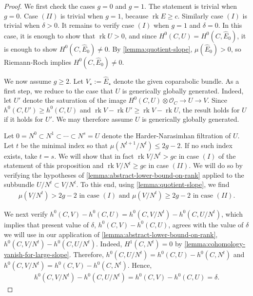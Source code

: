 \documentclass[12 pt]{amsart}
\theoremstyle{plain}
\theoremstyle{definition}
\theoremstyle{remark}
\numberwithin{equation}{section}
\DeclareMathOperator\rk{rk}
\begin{document}
\begin{proof}
	We first check the cases $g = 0$ and $g = 1$.
	The statement is trivial when $g = 0$.
	Case $(II)$ is trivial when $g = 1$, because
	$\rk E \geq c$. Similarly case $(I)$ is trivial when $\delta >
	0$.
	It remains to verify case $(I)$ when $g = 1$ and $\delta = 0$. 
	In this case, it is enough to show that $\rk U > 0$, 
	and since $H^0(C, U) = H^0(C, \widehat{E}_0)$,
	it is enough to show
	$H^0(C, \widehat{E}_0)\neq 0$.
	By \autoref{lemma:quotient-slope}, $\mu(\widehat{E}_0) > 0$,
	so Riemann-Roch implies $H^0(C, \widehat{E}_0) \neq 0$.

	We now assume $g \geq 2$.
	Let $V_\star := \widehat{E}_\star$ denote the given coparabolic bundle.
	As a first step, we reduce to the case that $U$ is generically globally
	generated.
	Indeed, let $U'$ denote the saturation of the image
	$H^0(C, U) \otimes \mathscr O_C \to U \to V$. 
	Since $h^0(C, U') \geq h^0(C, U)$ and $\rk V -
	\rk U' \geq \rk V - \rk U$, the result holds for $U$ if it holds for
	$U'$.
	We may therefore assume $U$ is generically globally generated.

	Let $0=N^0 \subset N^1 \subset \cdots \subset N^s = U$ denote the
	Harder-Narasimhan filtration of $U$.
	Let $t$ be the minimal index so that $\mu(N^{t+1}/N^{t}) \leq 2g-2$.
	If no such index exists, take $t = s$.
	We will show that in fact $\rk V/N^t > gc$ in case $(I)$ of the statement
	of this proposition
	and $\rk V/N^t \geq gc$ in case $(II)$.
	We will do so by verifying the hypotheses of
	\autoref{lemma:abstract-lower-bound-on-rank} applied to the subbundle
	$U/N^t \subset V/N^t$.
	To this end, using \autoref{lemma:quotient-slope},
	we find
	\begin{align}
		\label{equation:quotient-slope-bound}
		\mu(V/N^t) > 2g - 2 \text{ in case $(I)$ and }
	\mu(V/N^t) \geq 2g - 2 \text{ in case $(II)$.}
	\end{align}

	We next verify 
	$h^0(C, V)- h^0(C, U) = h^0(C,V/N^t) - h^0(C, U/N^t)$,
which implies that present value of $\delta$, $h^0(C, V)- h^0(C, U)$, agrees with the value of $\delta$ we will use
in our application of \autoref{lemma:abstract-lower-bound-on-rank},
	$h^0(C,V/N^t) - h^0(C, U/N^t)$.
	Indeed, $H^1(C, N^t) = 0$ by
	\autoref{lemma:cohomology-vanish-for-large-slope}.
	Therefore, 
	$h^0(C, U/N^t) = h^0(C, U) - h^0(C, N^t)$ and 
	$h^0(C, V/N^t) = h^0(C, V) - h^0(C, N^t)$. 
	Hence,
	\begin{align*}
		h^0(C, V/N^t)- h^0(C,U/N^t) = h^0(C, V) - h^0(C, U) = \delta.
	\end{align*}


\end{proof}
\end{document}
